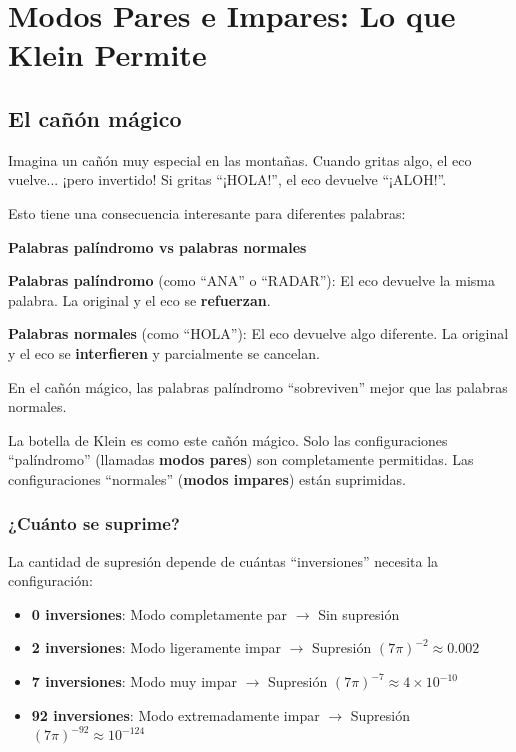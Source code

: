 \documentclass[12pt,a4paper,openany]{book}
\begin{document}
\chapter{Modos Pares e Impares: Lo que Klein Permite}

\begin{nivelnarrativo}

\section*{El cañón mágico}

Imagina un cañón muy especial en las montañas. Cuando gritas algo, el eco vuelve... ¡pero invertido! Si gritas ``¡HOLA!'', el eco devuelve ``¡ALOH!''.

Esto tiene una consecuencia interesante para diferentes palabras:

\begin{analogiabox}
\textbf{Palabras palíndromo vs palabras normales}

\textbf{Palabras palíndromo} (como ``ANA'' o ``RADAR''): El eco devuelve la misma palabra. La original y el eco se \textbf{refuerzan}.

\textbf{Palabras normales} (como ``HOLA''): El eco devuelve algo diferente. La original y el eco se \textbf{interfieren} y parcialmente se cancelan.

En el cañón mágico, las palabras palíndromo ``sobreviven'' mejor que las palabras normales.
\end{analogiabox}

La botella de Klein es como este cañón mágico. Solo las configuraciones ``palíndromo'' (llamadas \textbf{modos pares}) son completamente permitidas. Las configuraciones ``normales'' (\textbf{modos impares}) están suprimidas.

\subsection*{¿Cuánto se suprime?}

La cantidad de supresión depende de cuántas ``inversiones'' necesita la configuración:

\begin{itemize}
    \item \textbf{0 inversiones}: Modo completamente par $\to$ Sin supresión
    \item \textbf{2 inversiones}: Modo ligeramente impar $\to$ Supresión $(7\pi)^{-2} \approx 0.002$
    \item \textbf{7 inversiones}: Modo muy impar $\to$ Supresión $(7\pi)^{-7} \approx 4 \times 10^{-10}$
    \item \textbf{92 inversiones}: Modo extremadamente impar $\to$ Supresión $(7\pi)^{-92} \approx 10^{-124}$
\end{itemize}


\end{nivelnarrativo}
\end{document}
